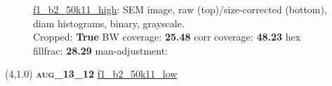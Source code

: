 \begin{figure}[h!]
\label{semimg16}
\caption*{\hyperlink{covtableaug_13_12}{\color{blue} \small \ttfamily f1\_b2\_50k11\_high}: SEM image, raw (top)/size-corrected (bottom), diam histograms, binary, grayscale.\\Cropped: {\bf True} \;\; BW coverage: {\bf 25.48} \:\: corr coverage: {\bf 48.23} \:\: hex fillfrac: {\bf 28.29} \:\: man-adjustment: {\bf \color{blue}{Yes}}}
\end{figure}
\newpage

\begin{textblock}{5}(4,1.0)
{\bf \textsc{aug\_13\_12}}
\hspace{4.5cm}
\hyperlink{covtableaug_13_12}{\color{blue} \large \ttfamily f1\_b2\_50k11\_low}
\end{textblock}


